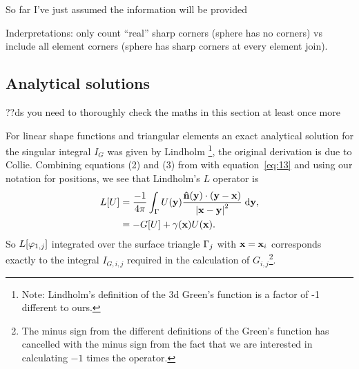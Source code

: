 So far I've just assumed the information will be provided

Inderpretations: only count ``real'' sharp corners (\ie sphere has no corners) vs include all element corners (\ie sphere has sharp corners at every element join).


\subsection{Analytical solutions}

??ds you need to thoroughly check the maths in this section at least once more

For linear shape functions and triangular elements an exact analytical solution for the singular integral $I_G$ was given by Lindholm \cite[App. B]{Lindholm1984}\footnote{Note: Lindholm's definition of the 3d Green's function is a factor of -1 different to ours.}, the original derivation is due to Collie\cite{Collie1976}. 
Combining equations (2) and (3) from \cite{Lindholm1984} with equation~\eqref{eq:13} and using our notation for positions, we see that Lindholm's $L$ operator is
\begin{equation}
  \begin{aligned}
    L[U] &= \frac{-1}{4 \pi}\int_{\Gamma} U(\mathbf{y}) \frac{\mathbf{\hat{n}}(\mathbf{y}) \cdot (\mathbf{y} -
      \mathbf{x})}{\left|{\mathbf{x} - \mathbf{y}} \right|^2}
    {\; \text{d}}\mathbf{y}, \\
    &= -G[U] + \gamma(\mathbf{x}) U(\mathbf{x}).
  \end{aligned}
\end{equation}
So $L[\varphi_{1,{j}}]$ integrated over the surface triangle ${\Gamma}_{j}$ with $\mathbf{x} = \mathbf{x}_{i}$ corresponds exactly to the integral $I_{G,i,j}$ required in the calculation of $G_{i,j}$\footnote{The minus sign from the different definitions of the Green's function has cancelled with the minus sign from the fact that we are interested in calculating $-1$ times the operator.}.

